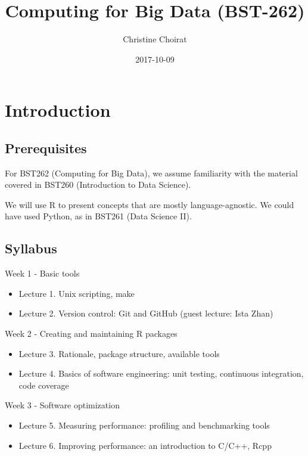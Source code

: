 \documentclass[]{book}
\title{Computing for Big Data (BST-262)}
\author{Christine Choirat}
\date{2017-10-09}
\providecommand{\tightlist}{%
  \setlength{\itemsep}{0pt}\setlength{\parskip}{0pt}}
\theoremstyle{definition}
\theoremstyle{definition}
\theoremstyle{definition}
\theoremstyle{remark}
\begin{document}
\maketitle

{
\setcounter{tocdepth}{1}
\tableofcontents
}
\chapter{Introduction}\label{intro}

\section{Prerequisites}\label{prerequisites}

For BST262 (Computing for Big Data), we assume familiarity with the
material covered in BST260 (Introduction to Data Science).

We will use R to present concepts that are mostly language-agnostic. We
could have used Python, as in BST261 (Data Science II).

\section{Syllabus}\label{syllabus}

Week 1 - Basic tools

\begin{itemize}
\tightlist
\item
  Lecture 1. Unix scripting, make
\item
  Lecture 2. Version control: Git and GitHub (guest lecture: Ista Zhan)
\end{itemize}

Week 2 - Creating and maintaining R packages

\begin{itemize}
\tightlist
\item
  Lecture 3. Rationale, package structure, available tools
\item
  Lecture 4. Basics of software engineering: unit testing, continuous
  integration, code coverage
\end{itemize}

Week 3 - Software optimization

\begin{itemize}
\tightlist
\item
  Lecture 5. Measuring performance: profiling and benchmarking tools
\item
  Lecture 6. Improving performance: an introduction to C/C++, Rcpp
\end{itemize}
\end{document}
